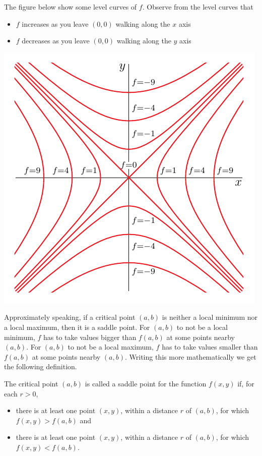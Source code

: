 \begin{eg}[$f(x,y)=x^2-y^2$]
\begin{efig}
\begin{center}
\end{center}
\end{efig}
The figure below show some level curves of $f$. Observe from the level 
curves that
\begin{itemize}
\item
$f$ increases as you leave $(0,0)$ walking along the $x$ axis
\item
$f$ decreases as you leave $(0,0)$ walking along the $y$ axis
\end{itemize}
\goodbreak
\begin{efig}
\begin{center}
  \includegraphics[scale=0.95]{hypParaLevel}
\end{center}
\end{efig}

\end{eg}

Approximately speaking, if a critical point $(a,b)$ is neither a local 
minimum nor a local maximum, then it is a saddle point. For $(a,b)$ to not
be a local minimum, $f$ has to take values bigger than $f(a,b)$ at some
points nearby $(a,b)$. For $(a,b)$ to not be a local maximum, $f$ has to take values smaller than $f(a,b)$ at some points nearby $(a,b)$.  Writing this
more mathematically we get the following definition.


\begin{defn}\label{def saddle point}
The critical point $(a,b)$ is called a saddle point for the function 
$f(x,y)$ if, for each $r>0$, 
\begin{itemize}
\item 
there is at least one point $(x,y)$, within a distance $r$ of $(a,b)$,
for which $f(x,y)>f(a,b)$ and
\item
there is at least one point $(x,y)$, within a distance $r$ of $(a,b)$,
for which $f(x,y)<f(a,b)$.
\end{itemize}
\end{defn}

